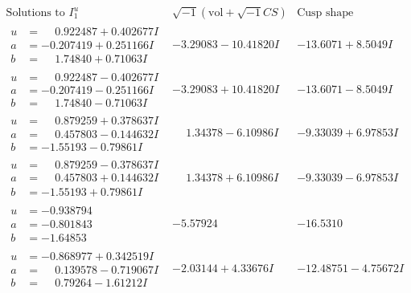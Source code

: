\documentclass[1p]{elsarticle_modified}
\theoremstyle{definition}
\newcommand{\I}{\sqrt{-1}}
\begin{document}
$$\begin{array}{c|c|c}  
\text{Solutions to }I^u_{1}& \I (\text{vol} + \sqrt{-1}CS) & \text{Cusp shape}\\
 \hline 
\begin{aligned}
u &= \phantom{-}0.922487 + 0.402677 I \\
a &= -0.207419 + 0.251166 I \\
b &= \phantom{-}1.74840 + 0.71063 I\end{aligned}
 & -3.29083 - 10.41820 I & -13.6071 + 8.5049 I \\ \hline\begin{aligned}
u &= \phantom{-}0.922487 - 0.402677 I \\
a &= -0.207419 - 0.251166 I \\
b &= \phantom{-}1.74840 - 0.71063 I\end{aligned}
 & -3.29083 + 10.41820 I & -13.6071 - 8.5049 I \\ \hline\begin{aligned}
u &= \phantom{-}0.879259 + 0.378637 I \\
a &= \phantom{-}0.457803 - 0.144632 I \\
b &= -1.55193 - 0.79861 I\end{aligned}
 & \phantom{-}1.34378 - 6.10986 I & -9.33039 + 6.97853 I \\ \hline\begin{aligned}
u &= \phantom{-}0.879259 - 0.378637 I \\
a &= \phantom{-}0.457803 + 0.144632 I \\
b &= -1.55193 + 0.79861 I\end{aligned}
 & \phantom{-}1.34378 + 6.10986 I & -9.33039 - 6.97853 I \\ \hline\begin{aligned}
u &= -0.938794\phantom{ +0.000000I} \\
a &= -0.801843\phantom{ +0.000000I} \\
b &= -1.64853\phantom{ +0.000000I}\end{aligned}
 & -5.57924\phantom{ +0.000000I} & -16.5310\phantom{ +0.000000I} \\ \hline\begin{aligned}
u &= -0.868977 + 0.342519 I \\
a &= \phantom{-}0.139578 - 0.719067 I \\
b &= \phantom{-}0.79264 - 1.61212 I\end{aligned}
 & -2.03144 + 4.33676 I & -12.48751 - 4.75672 I \\ \hline\begin{aligned}

\end{aligned}
\end{array}$$
\end{document}
